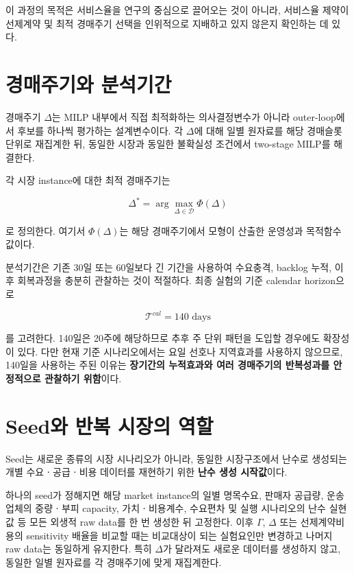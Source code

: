 \documentclass[11pt,a4paper]{article}
\begin{document}
이 과정의 목적은 서비스율을 연구의 중심으로 끌어오는 것이 아니라,
서비스율 제약이 선제계약 및 최적 경매주기 선택을 인위적으로 지배하고 있지 않은지 확인하는 데 있다.

\section{경매주기와 분석기간}

경매주기 $\Delta$는 MILP 내부에서 직접 최적화하는 의사결정변수가 아니라
outer-loop에서 후보를 하나씩 평가하는 설계변수이다.
각 $\Delta$에 대해 일별 원자료를 해당 경매슬롯 단위로 재집계한 뒤,
동일한 시장과 동일한 불확실성 조건에서 two-stage MILP를 해결한다.

각 시장 instance에 대한 최적 경매주기는

\[
\boxed{
\Delta^*
=
\arg\max_{\Delta\in\mathcal D}
\Phi(\Delta)
}
\]

로 정의한다.
여기서 $\Phi(\Delta)$는 해당 경매주기에서 모형이 산출한 운영성과 목적함수 값이다.

분석기간은 기존 30일 또는 60일보다 긴 기간을 사용하여
수요충격, backlog 누적, 이후 회복과정을 충분히 관찰하는 것이 적절하다.
최종 실험의 기준 calendar horizon으로

\[
\boxed{\mathcal T^{cal}=140\text{ days}}
\]

를 고려한다.
140일은 20주에 해당하므로 추후 주 단위 패턴을 도입할 경우에도 확장성이 있다.
다만 현재 기준 시나리오에서는 요일 선호나 지역효과를 사용하지 않으므로,
140일을 사용하는 주된 이유는 \textbf{장기간의 누적효과와 여러 경매주기의 반복성과를 안정적으로 관찰하기 위함}이다.

\section{Seed와 반복 시장의 역할}

Seed는 새로운 종류의 시장 시나리오가 아니라,
동일한 시장구조에서 난수로 생성되는 개별 수요ㆍ공급ㆍ비용 데이터를 재현하기 위한
\textbf{난수 생성 시작값}이다.

하나의 seed가 정해지면 해당 market instance의 일별 명목수요, 판매자 공급량,
운송업체의 중량ㆍ부피 capacity, 가치ㆍ비용계수, 수요편차 및 실행 시나리오의 난수 실현값 등
모든 외생적 raw data를 한 번 생성한 뒤 고정한다.
이후 $\Gamma$, $\Delta$ 또는 선제계약비용의 sensitivity 배율을 비교할 때는
비교대상이 되는 실험요인만 변경하고 나머지 raw data는 동일하게 유지한다.
특히 $\Delta$가 달라져도 새로운 데이터를 생성하지 않고,
동일한 일별 원자료를 각 경매주기에 맞게 재집계한다.
\end{document}
